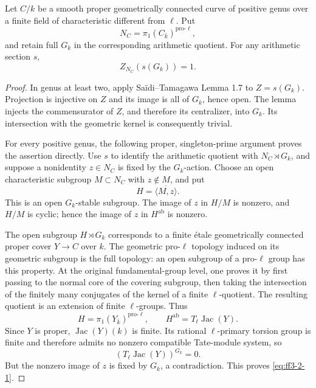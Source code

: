 \begin{lemma}
\label{lem:ff3-centralizer}

Let \(C/k\) be a smooth proper geometrically connected curve of positive genus over a finite field of characteristic different from \(\ell\). Put \[
 N_C=\pi_1(C_{\bar k})^{\mathrm{pro}\text{-}\ell},
\] and retain full \(G_k\) in the corresponding arithmetic quotient. For any arithmetic section \(s\), \begin{equation}
Z_{N_C}(s(G_k))=1.
\label{eq:ff3-2-1}
\end{equation}

\end{lemma}
\begin{proof}

In genus at least two, apply Saïdi--Tamagawa Lemma 1.7 to \(Z=s(G_k)\). Projection is injective on \(Z\) and its image is all of \(G_k\), hence open. The lemma injects the commensurator of \(Z\), and therefore its centralizer, into \(G_k\). Its intersection with the geometric kernel is consequently trivial.

For every positive genus, the following proper, singleton-prime argument proves the assertion directly. Use \(s\) to identify the arithmetic quotient with \(N_C\rtimes G_k\), and suppose a nonidentity \(z\in N_C\) is fixed by the \(G_k\)-action. Choose an open characteristic subgroup \(M\subset N_C\) with \(z\notin M\), and put \[
 H=\overline{\langle M,z\rangle}.
\] This is an open \(G_k\)-stable subgroup. The image of \(z\) in \(H/M\) is nonzero, and \(H/M\) is cyclic; hence the image of \(z\) in \(H^{\mathrm{ab}}\) is nonzero.

The open subgroup \(H\rtimes G_k\) corresponds to a finite étale geometrically connected proper cover \(Y\to C\) over \(k\). The geometric pro-\(\ell\) topology induced on its geometric subgroup is the full topology: an open subgroup of a pro-\(\ell\) group has this property. At the original fundamental-group level, one proves it by first passing to the normal core of the covering subgroup, then taking the intersection of the finitely many conjugates of the kernel of a finite \(\ell\)-quotient. The resulting quotient is an extension of finite \(\ell\)-groups. Thus \[
 H=\pi_1(Y_{\bar k})^{\mathrm{pro}\text{-}\ell},
 \qquad H^{\mathrm{ab}}=T_\ell\operatorname{Jac}(Y).
\] Since \(Y\) is proper, \(\operatorname{Jac}(Y)(k)\) is finite. Its rational \(\ell\)-primary torsion group is finite and therefore admits no nonzero compatible Tate-module system, so \[
 (T_\ell\operatorname{Jac}(Y))^{G_k}=0.
\] But the nonzero image of \(z\) is fixed by \(G_k\), a contradiction. This proves \eqref{eq:ff3-2-1}.

\end{proof}

